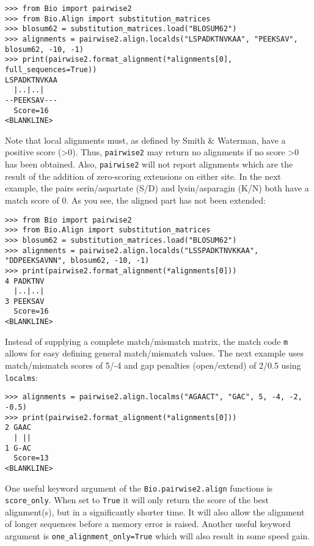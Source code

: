 \begin{verbatim}
>>> from Bio import pairwise2
>>> from Bio.Align import substitution_matrices
>>> blosum62 = substitution_matrices.load("BLOSUM62")
>>> alignments = pairwise2.align.localds("LSPADKTNVKAA", "PEEKSAV", blosum62, -10, -1)
>>> print(pairwise2.format_alignment(*alignments[0], full_sequences=True))
LSPADKTNVKAA
  |..|..|   
--PEEKSAV---
  Score=16
<BLANKLINE>
\end{verbatim}

Note that local alignments must, as defined by Smith \& Waterman, have a 
positive score (\textgreater 0). Thus, \verb|pairwise2| may return no
alignments if no score \textgreater 0 has been obtained. Also, \verb|pairwise2|
will not report alignments which are the result of the addition of zero-scoring
extensions on either site. In the next example, the pairs serin/aspartate (S/D)
and lysin/asparagin (K/N) both have a match score of 0. As you see, the aligned
part has not been extended:

\begin{verbatim}
>>> from Bio import pairwise2
>>> from Bio.Align import substitution_matrices
>>> blosum62 = substitution_matrices.load("BLOSUM62")
>>> alignments = pairwise2.align.localds("LSSPADKTNVKKAA", "DDPEEKSAVNN", blosum62, -10, -1)
>>> print(pairwise2.format_alignment(*alignments[0]))
4 PADKTNV
  |..|..|
3 PEEKSAV
  Score=16
<BLANKLINE>
\end{verbatim}

Instead of supplying a complete match/mismatch matrix, the match code
\texttt{m} allows for easy defining general match/mismatch values. The next
example uses match/mismatch scores of 5/-4 and gap penalties (open/extend)
of 2/0.5 using \verb|localms|:

\begin{verbatim}
>>> alignments = pairwise2.align.localms("AGAACT", "GAC", 5, -4, -2, -0.5)
>>> print(pairwise2.format_alignment(*alignments[0]))
2 GAAC
  | ||
1 G-AC
  Score=13
<BLANKLINE>
\end{verbatim}

One useful keyword argument of the \verb|Bio.pairwise2.align| functions is
\texttt{score\_only}. When set to \texttt{True} it will only return the score
of the best alignment(s), but in a significantly shorter time. It will also
allow the alignment of longer sequences before a memory error is raised.
Another useful keyword argument is \texttt{one\_alignment\_only=True} which
will also result in some speed gain.

